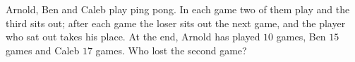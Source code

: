 Arnold, Ben and Caleb play ping pong. In each game two of them play and the third sits out; after each game the loser sits out the next game, and the player who sat out takes his place. At the end, Arnold has played $10$ games, Ben $15$ games and Caleb $17$ games. Who lost the second game?

